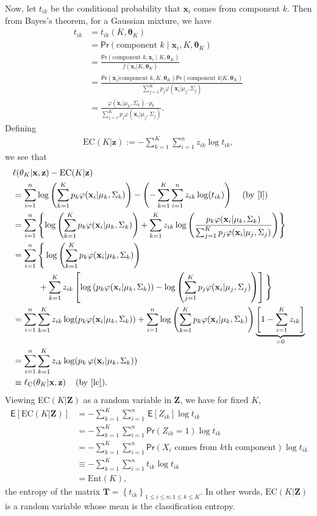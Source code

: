 \documentclass{uwstat572}
\newcommand*\htab{\hspace{4 mm}}
\newcommand*\ba{\[ \begin{aligned}}
\newcommand*\ea{\end{aligned} \]}
\newcommand*\E[1]{\;\mathsf{E}\left[#1\right]}
\newcommand*\set[1]{\left\{#1\right\}}
\newcommand*\bT{\mathbf{T}}
\newcommand*\bx{\mathbf{x}}
\newcommand*\bZ{\mathbf{Z}}
\newcommand*\bz{\mathbf{z}}
\newcommand*\btheta{\boldsymbol{\theta}}
\renewcommand\;{\,}
\renewcommand\phi{\varphi}
\renewcommand\Pr[1]{ \mathsf{Pr}\left(#1\right) }
\begin{document}
Now, let $t_{ik}$ be the conditional probability that $\bx_i$ comes from component $k$.
Then from Bayes's theorem, for a Gaussian mixture, we have
\begin{align}\label{tik}
t_{ik} \nonumber
	& = t_{ik}(K, \btheta_K) \\  \nonumber
	& = \Pr{\text{component } k \mid \bx_i, K, \btheta_K} \\
	& = \frac{\Pr{ \text{component }k, \bx_i \mid K, \btheta_K}}
		{f(\bx_i|K,\btheta_K)} \nonumber \\ 
	& = \frac{\Pr{ \bx_i | \text{component } k, K, \btheta_K }
		\Pr{\text{component } k | K, \btheta_K}}
		{ \sum_{j=1}^K p_j \phi(\bx_i | \mu_j, \Sigma_j) } \nonumber \\
 	& = \frac{ \phi(\bx_i | \mu_k, \Sigma_k) \cdot p_k }
 	{ \sum_{j=1}^K p_j \phi(\bx_i | \mu_j, \Sigma_j) }.
\end{align}
Defining
\ba
\text{EC}(K | \bz) := - \sum_{k=1}^K \sum_{i=1}^n z_{ik} \log t_{ik},
\ea
we see that
\ba
\; & \ell(\theta_K|\bx, \bz) - \text{EC}(K|\bz) \\
	& = \sum_{i=1}^n \log\left( 
		\sum_{k=1}^K p_k \phi(\bx_i | \mu_k, \Sigma_k) \right)
		- \left( - \sum_{k=1}^K \sum_{i=1}^n z_{ik} \log(t_{ik}) \right)
		\htab \text{(by \eqref{l})} \\
	& = \sum_{i=1}^n \left\{
		\log\left(\sum_{k=1}^K p_k \phi(\bx_i | \mu_k, \Sigma_k) \right)
		+ \sum_{k=1}^K z_{ik} \log\left( \frac{p_k \phi(\bx_i | \mu_k, \Sigma_k)}{ \sum_{j=1}^K p_j \phi(\bx_i | \mu_j, \Sigma_j) } \right)
		\right\} \\
	& = \sum_{i=1}^n \Bigg\{
		\log\left(\sum_{k=1}^K p_k \phi(\bx_i | \mu_k, \Sigma_k) \right)
		\\
	& \hspace{3em} + \sum_{k=1}^K z_{ik} \left[ \log\left( p_k \phi(\bx_i | \mu_k, \Sigma_k) \right)
		- \log \left( \sum_{j=1}^K p_j \phi(\bx_i | \mu_j, \Sigma_j) \right) \right]
		\Bigg\} \\
	& = \sum_{i=1}^n \sum_{k=1}^K z_{ik} \log(p_k \phi(\bx_i | \mu_k, \Sigma_k))
		+ \sum_{i=1}^n \log\left(\sum_{k=1}^K p_k \phi(\bx_i | \mu_k, \Sigma_k) \right)
			\underbrace{\left[ 1 - \sum_{i=1}^K z_{ik} \right]}_{=0} \\
	& = \sum_{i=1}^n \sum_{k=1}^K z_{ik} 
		\log(p_k \; \phi(\bx_i | \mu_k, \Sigma_k)) \\
	& \equiv \ell_\text{C}(\theta_K|\bx, \bz) \htab \text{(by \eqref{lc})}.
\ea
Viewing EC$(K | \bZ)$ as a random variable in $\bZ$, we have for fixed $K$,
\ba
\E{ \text{EC}(K | \bZ) } & = - \sum_{k=1}^K \sum_{i=1}^n \E{Z_{ik}} \log t_{ik} \\
	& = - \sum_{k=1}^K \sum_{i=1}^n \Pr{Z_{ik} = 1} \log t_{ik} \\
	& = - \sum_{k=1}^K \sum_{i=1}^n \Pr{X_i \text{ comes from $k$th component} } \log t_{ik} \\
	& \equiv -  \sum_{k=1}^K \sum_{i=1}^n t_{ik} \log t_{ik} \\
	& = \text{Ent}(K),
\ea
the entropy of the matrix $\bT = \set{t_{ik}}_{1\le i \le n; 1 \le k \le K}$.
In other words, $\text{EC}(K | \bZ)$ is a random variable whose mean is the classification entropy.
\end{document}
